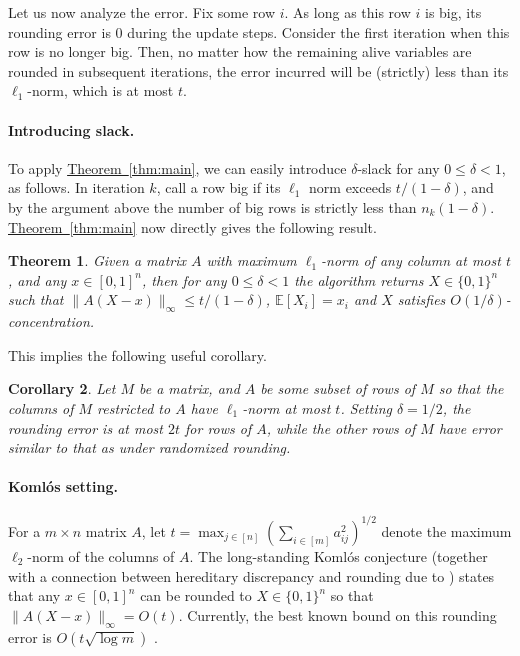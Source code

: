 \documentclass[11pt]{article}
\newcommand{\E}{\mathbb{E}}
\newtheorem{theorem}{Theorem}[section]
\newtheorem{corollary}[theorem]{Corollary}
\theoremstyle{definition}
\newcommand{\expref}[2]{\texorpdfstring{\hyperref[#2]{#1~\ref{#2}}}{#1~\ref{#2}}}
\begin{document}
Let us now analyze the error. Fix some row $i$. As long as this row $i$ is big, its rounding error is $0$ during the update steps. Consider the first iteration when this row is no longer big. Then, no matter how the remaining alive variables are rounded in subsequent iterations, the error incurred will be (strictly) less than its $\ell_1$-norm, which is at most $t$.
\paragraph{Introducing slack.} To apply \expref{Theorem}{thm:main}, we can easily introduce $\delta$-slack for any $0 \leq \delta < 1$, as follows. In iteration $k$, call a row big if its $\ell_1$ norm exceeds $t/(1-\delta)$,
and by the argument above the number of big rows is strictly less than $n_k(1-\delta)$. 
\expref{Theorem}{thm:main} now directly gives the following result.

\begin{theorem}
\label{thm:bf} Given a matrix $A$ with maximum  $\ell_1$-norm of any column at most $t$, and any $x\in [0,1]^n$, then for any $0\leq \delta < 1$ the algorithm returns $X\in \{0,1\}^n$ such that $\|A(X-x)\|_\infty \leq t/(1-\delta)$, $\E[X_i]=x_i$ and $X$ satisfies $O(1/\delta)$-concentration.
\end{theorem}

This implies the following useful corollary.
\begin{corollary} Let $M$ be a matrix, and $A$ be some subset of rows of $M$ so that the columns of $M$ restricted to $A$ have $\ell_1$-norm at most $t$. Setting $\delta=1/2$, the rounding error is at most $2t$ for rows of $A$, while the other rows of $M$ have error similar to that as under randomized rounding.
\end{corollary}
\paragraph{Koml\'{o}s setting.}
For a $m \times n$ matrix $A$, let $t = \max_{j \in [n]} (\sum_{i\in [m]} a_{ij}^2)^{1/2}$ denote the maximum $\ell_2$-norm of the columns of  $A$.
%
The long-standing Koml\'{o}s conjecture (together with a connection between hereditary discrepancy and rounding due to \cite{LSV86}) states that any $x \in [0,1]^n$ can be rounded to $X \in \{0,1\}^n$ so that $\|A(X-x)\|_\infty = O(t)$.
Currently, the best known bound on this rounding error is $O(t \sqrt{\log m})$ \cite{Bana98,BDG16}.

\smallskip
\end{document}
